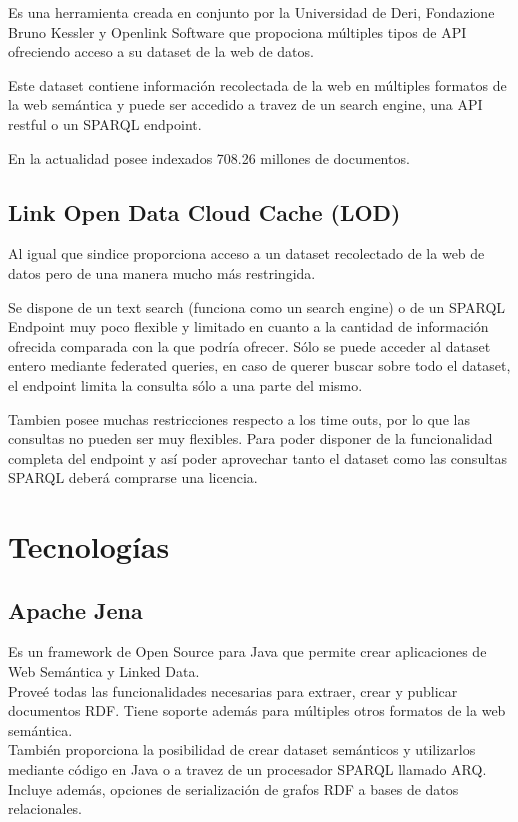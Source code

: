 Es una herramienta creada en conjunto por la Universidad de Deri,  Fondazione Bruno Kessler y Openlink Software que propociona 
múltiples tipos de API ofreciendo acceso a su dataset de la web de datos. 

Este dataset contiene información recolectada de la web en múltiples formatos de la web semántica y puede ser accedido a travez 
de un search engine, una API restful o un SPARQL endpoint. 

En la actualidad posee indexados 708.26 millones de documentos.

\subsection{Link Open Data Cloud Cache (LOD)} 

Al igual que sindice proporciona acceso a un dataset recolectado de la web de datos pero de una manera mucho más restringida. 

Se dispone de un text search (funciona como un search engine) o de un SPARQL Endpoint muy poco flexible y limitado en cuanto a 
la cantidad de información ofrecida comparada con la que podría ofrecer. Sólo se puede acceder al dataset entero mediante federated
queries, en caso de querer buscar sobre todo el dataset, el endpoint limita la consulta sólo a una parte del mismo. 

Tambien posee muchas restricciones respecto a los time outs, por lo que las consultas no pueden ser muy flexibles.
Para poder disponer de la funcionalidad completa del endpoint y así poder aprovechar tanto el dataset como las consultas SPARQL 
deberá comprarse una licencia.


\section{Tecnologías}

\subsection{Apache Jena}

Es un framework de Open Source para Java que permite crear aplicaciones de Web Semántica y Linked Data. \\
Proveé todas las funcionalidades necesarias para extraer, crear y publicar documentos RDF. Tiene soporte además para múltiples otros 
formatos de la web semántica. \\
También proporciona la posibilidad de crear dataset semánticos y utilizarlos mediante código en Java o a travez de un procesador SPARQL 
llamado ARQ.\\
Incluye además, opciones de serialización de grafos RDF a bases de datos relacionales.

